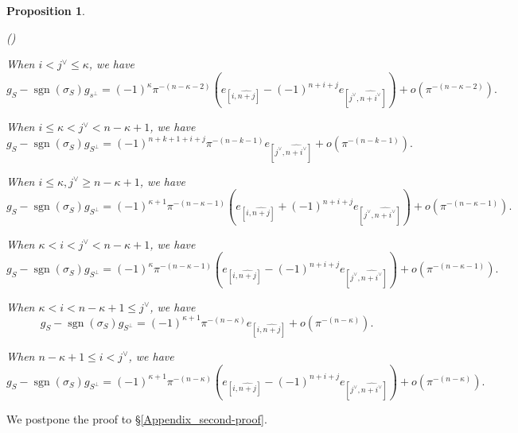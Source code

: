 \documentclass[pdflatex,sn-mathphys-num]{sn-jnl}%
\theoremstyle{thmstyleone}%
\newtheorem{proposition}[subsubsection]{Proposition}%
\theoremstyle{thmstyletwo}%
\numberwithin{equation}{subsection}
\theoremstyle{thmstylethree}%
\DeclareMathOperator{\sgn}{sgn}
\newcommand{\wh}{\widehat}
\newenvironment{altenumerate}
	{\begin{list}
			{(\theenumi) }
			{\usecounter{enumi}
				\setlength{\labelwidth}{0pt}
				\setlength{\labelsep}{0pt}
				\setlength{\leftmargin}{0pt}
				\setlength{\itemsep}{\the\smallskipamount}
				\renewcommand{\theenumi}{\roman{enumi}}
		}}
		{\end{list}}
\begin{document}
\begin{proposition}
\begin{altenumerate}
	\item When $i<j^\vee\leq \kappa$, we have
 \begin{equation*}
     g_S-\sgn(\sigma_S)g_{s^\perp}=(-1)^\kappa\pi^{-(n-\kappa-2)}
	\left(
	e_{[i,\wh{n+j}]}-(-1)^{n+i+j}e_{[j^\vee,\wh{n+i^\vee}]}
	\right)+o(\pi^{-(n-\kappa-2)}).
 \end{equation*}
							
	\item When $i\leq \kappa<j^\vee<n-\kappa+1$, we have
\begin{equation*}
    g_S-\sgn(\sigma_S)g_{S^\perp}=(-1)^{n+k+1+i+j}\pi^{-(n-k-1)}e_{[j^\vee,\wh{n+i^\vee}]}+o(\pi^{-(n-k-1)}).
\end{equation*}
				
	\item When $i\leq \kappa,j^\vee\geq n-\kappa+1$, we have
	\[
	g_S-\sgn(\sigma_S)g_{S^\perp}=(-1)^{\kappa+1}\pi^{-(n-\kappa-1)}
	\left(
	e_{[i,\wh{n+j}]}+(-1)^{n+i+j}e_{[j^\vee,\wh{n+i^\vee}]}
	\right)+o(\pi^{-(n-\kappa-1)}).
	\]
				
	\item When $\kappa<i<j^\vee<n-\kappa+1$, we have
	\[
	g_S-\sgn(\sigma_S)g_{S^\perp}=
	(-1)^\kappa\pi^{-(n-\kappa-1)}
	\left( 
		e_{[i,\wh{n+j}]}-(-1)^{n+i+j}e_{[j^\vee,\wh{n+i^\vee}]}
		\right)+o(\pi^{-(n-\kappa-1)}).
	\]
				
	\item When $\kappa<i<n-\kappa+1\leq j^\vee$, we have
	\[
		g_S-\sgn(\sigma_S)g_{S^\perp}=(-1)^{\kappa+1}\pi^{-(n-\kappa)}e_{[i,\wh{n+j}]}+o(\pi^{-(n-\kappa)}).
	\]
				
	\item When $n-\kappa+1\leq i<j^\vee$, we have
	\[
		g_S-\sgn(\sigma_S)g_{S^\perp}=(-1)^{\kappa+1}\pi^{-(n-\kappa)}\left(
		e_{[i,\wh{n+j}]}-(-1)^{n+i+j}e_{[j^\vee,\wh{n+i^\vee}]}
		\right)+o(\pi^{-(n-\kappa)}).
	\]
	\end{altenumerate}
\end{proposition}
We postpone the proof to \S \ref{Appendix_second-proof}.
		
\end{document}
